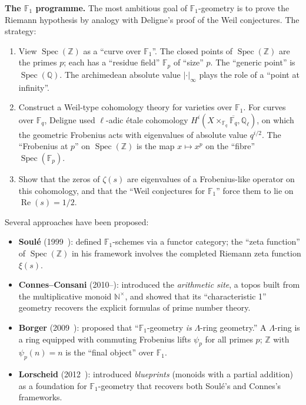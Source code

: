 \documentclass[11pt,a4paper]{article}
\theoremstyle{plain}
\theoremstyle{definition}
\newcommand{\Z}{\mathbb{Z}}
\newcommand{\N}{\mathbb{N}}
\newcommand{\Q}{\mathbb{Q}}
\newcommand{\F}{\mathbb{F}}
\newcommand{\Spec}{\operatorname{Spec}}
\begin{document}
\begin{tcolorbox}[breakable, colback=blue!8, colframe=blue!8,
  boxrule=0pt, sharp corners]
\textbf{The $\F_1$ programme.}
The most ambitious goal of $\F_1$-geometry is to prove the Riemann
hypothesis by analogy with Deligne's proof of the Weil conjectures.
The strategy:

\begin{enumerate}
\item View $\Spec(\Z)$ as a ``curve over $\F_1$''. The closed points
  of $\Spec(\Z)$ are the primes $p$; each has a ``residue field''
  $\F_p$ of ``size'' $p$. The ``generic point'' is $\Spec(\Q)$.
  The archimedean absolute value $|\cdot|_\infty$ plays the role of
  a ``point at infinity''.

\item Construct a Weil-type cohomology theory for varieties over
  $\F_1$. For curves over $\F_q$, Deligne used $\ell$-adic
  \'etale cohomology $H^i(X \times_{\F_q} \overline{\F_q}, \Q_\ell)$,
  on which the geometric Frobenius acts with eigenvalues of absolute
  value $q^{i/2}$. The ``Frobenius at $p$'' on $\Spec(\Z)$ is the
  map $x \mapsto x^p$ on the ``fibre'' $\Spec(\F_p)$.

\item Show that the zeros of $\zeta(s)$ are eigenvalues of a
  Frobenius-like operator on this cohomology, and that the ``Weil
  conjectures for $\F_1$'' force them to lie on $\operatorname{Re}(s) = 1/2$.
\end{enumerate}

\medskip
Several approaches have been proposed:
\begin{itemize}
\item \textbf{Soul\'e} (1999~\cite{Soule2004}): defined $\F_1$-schemes
  via a functor category; the ``zeta function'' of $\Spec(\Z)$ in his
  framework involves the completed Riemann zeta function $\xi(s)$.
\item \textbf{Connes--Consani} (2010--\cite{ConnesConsani2011}):
  introduced the \emph{arithmetic site}, a topos built from the
  multiplicative monoid $\N^\times$, and showed that its
  ``characteristic 1'' geometry recovers the explicit formulas of
  prime number theory.
\item \textbf{Borger} (2009~\cite{Borger2009}): proposed that
  ``$\F_1$-geometry \emph{is} $\Lambda$-ring geometry.'' A
  $\Lambda$-ring is a ring equipped with commuting Frobenius lifts
  $\psi_p$ for all primes $p$; $\Z$ with $\psi_p(n) = n$ is the
  ``final object'' over $\F_1$.
\item \textbf{Lorscheid} (2012~\cite{Lorscheid2018}): introduced
  \emph{blueprints} (monoids with a partial addition) as a foundation
  for $\F_1$-geometry that recovers both Soul\'e's and Connes's
  frameworks.
\end{itemize}
\end{tcolorbox}
\end{document}
